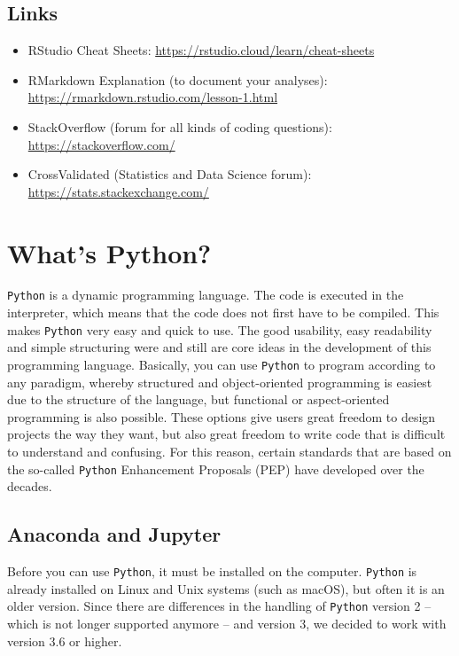 \documentclass[
  11pt,
]{book}
\providecommand{\tightlist}{%
  \setlength{\itemsep}{0pt}\setlength{\parskip}{0pt}}
\begin{document}
\begin{tips}
\end{tips}

\hypertarget{links}{%
\subsection{Links}\label{links}}

\begin{itemize}
\tightlist
\item
  RStudio Cheat Sheets: \url{https://rstudio.cloud/learn/cheat-sheets}
\item
  RMarkdown Explanation (to document your analyses):
  \url{https://rmarkdown.rstudio.com/lesson-1.html}
\item
  StackOverflow (forum for all kinds of coding questions):
  \url{https://stackoverflow.com/}
\item
  CrossValidated (Statistics and Data Science forum):
  \url{https://stats.stackexchange.com/}
\end{itemize}

\hypertarget{whats-python}{%
\section{What's Python?}\label{whats-python}}

\texttt{Python} is a dynamic programming language. The code is executed
in the interpreter, which means that the code does not first have to be
compiled. This makes \texttt{Python} very easy and quick to use. The
good usability, easy readability and simple structuring were and still
are core ideas in the development of this programming language.
Basically, you can use \texttt{Python} to program according to any
paradigm, whereby structured and object-oriented programming is easiest
due to the structure of the language, but functional or aspect-oriented
programming is also possible. These options give users great freedom to
design projects the way they want, but also great freedom to write code
that is difficult to understand and confusing. For this reason, certain
standards that are based on the so-called \texttt{Python} Enhancement
Proposals (PEP) have developed over the decades.

\hypertarget{anaconda-and-jupyter}{%
\subsection{Anaconda and Jupyter}\label{anaconda-and-jupyter}}

Before you can use \texttt{Python}, it must be installed on the
computer. \texttt{Python} is already installed on Linux and Unix systems
(such as macOS), but often it is an older version. Since there are
differences in the handling of \texttt{Python} version 2 -- which is not
longer supported anymore -- and version 3, we decided to work with
version 3.6 or higher.
\end{document}
